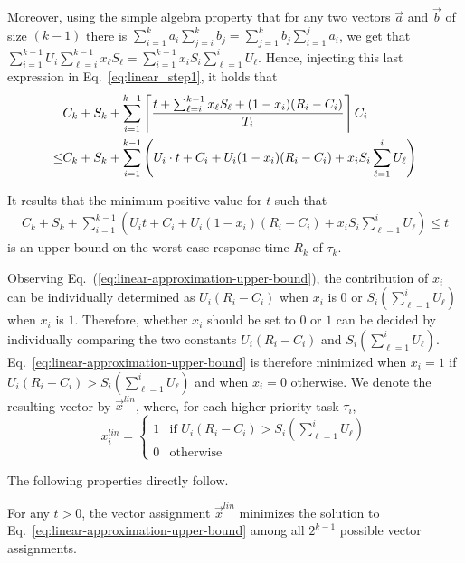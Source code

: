 Moreover, using the simple algebra property that for any two vectors $\vec{a}$ and $\vec{b}$ of size $(k-1)$ there is $\sum_{i=1}^{k} a_i \sum_{j=i}^{k} b_j = \sum_{j=1}^{k} b_j \sum_{i=1}^{j} a_i$, we get that $\sum_{i=1}^{k-1} U_i\sum_{\ell=i}^{k-1}x_\ell S_\ell = \sum_{i=1}^{k-1} x_i S_i \sum_{\ell=1}^{i}U_\ell $. Hence, injecting this last expression in Eq.~\eqref{eq:linear_step1}, it holds that
{\footnotesize
\begin{align*}
& C_k + S_k + \sum_{i=1}^{k-1}\left\lceil{\frac{t+\sum_{\ell=i}^{k-1}x_\ell S_\ell+(1-x_i)(R_i-C_i)}{T_i}}\right\rceil C_i\\
\leq & C_k + S_k + \sum_{i=1}^{k-1}  \left(U_i\cdot t + C_i + U_i (1-x_i)(R_i-C_i) + x_i S_i\sum_{\ell=1}^{i}U_\ell \right)
\end{align*}}

It results that the minimum positive value for $t$ such that
{\footnotesize\begin{align}
\label{eq:linear-approximation-upper-bound}
C_k + S_k + \sum_{i=1}^{k-1}  \left(U_i t + C_i + U_i (1-x_i)(R_i-C_i) + x_i S_i\sum_{\ell=1}^{i}U_\ell \right) \leq t
\end{align}}
is an upper bound on the worst-case response time $R_k$ of $\tau_k$.

Observing Eq.~(\ref{eq:linear-approximation-upper-bound}), the
contribution of $x_i$ can be individually determined as $U_i(R_i-C_i)$
when $x_i$ is $0$ or $S_i(\sum_{\ell=1}^{i}U_\ell)$ when $x_i$ is
$1$. Therefore, whether $x_i$ should be set to $0$ or $1$ can be 
decided by individually comparing the two constants
$U_i(R_i-C_i)$ and $S_i(\sum_{\ell=1}^{i}U_\ell)$. Eq.~\eqref{eq:linear-approximation-upper-bound} is therefore minimized when $x_i=1$ if $U_i(R_i-C_i) > S_i(\sum_{\ell=1}^{i}U_\ell)$ and when $x_i = 0$ otherwise. We denote the resulting vector by $\vec{x}^{\mathit{lin}}$, where, for
each higher-priority task $\tau_i$,
\begin{equation}
\label{eq:x-linear}
x_i^{\mathit{lin}} =
\begin{cases}
1 & \text{if~} U_i(R_i-C_i) > S_i(\sum_{\ell=1}^{i}U_\ell) \\
0 & \text{otherwise}
\end{cases}
\end{equation}

The following properties directly follow.
\begin{Property}
For any $t > 0$, the vector assignment $\vec{x}^{\mathit{lin}}$ minimizes
  the solution to Eq.~\eqref{eq:linear-approximation-upper-bound} among all $2^{k-1}$ possible vector assignments.
\end{Property}




